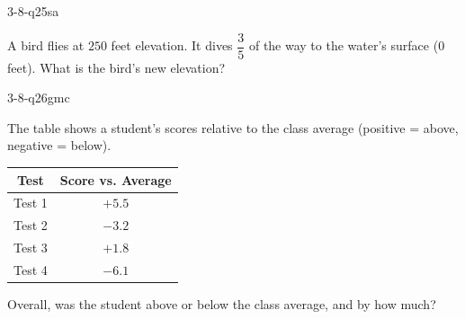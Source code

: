 \begin{practiceQuestion}{3-8-q25}{sa}
\begin{questionText}
A bird flies at $250$ feet elevation. It dives $\dfrac{3}{5}$ of the way to the water's surface ($0$ feet). What is the bird's new elevation?
\end{questionText}
\end{practiceQuestion}


\begin{practiceQuestion}{3-8-q26}{gmc}
\begin{questionText}
The table shows a student's scores relative to the class average (positive = above, negative = below).

\begin{center}
\begin{tabular}{|c|c|}
\hline
\textbf{Test} & \textbf{Score vs. Average} \\
\hline
Test 1 & $+5.5$ \\
\hline
Test 2 & $-3.2$ \\
\hline
Test 3 & $+1.8$ \\
\hline
Test 4 & $-6.1$ \\
\hline
\end{tabular}
\end{center}

Overall, was the student above or below the class average, and by how much?
\end{questionText}
\end{practiceQuestion}

